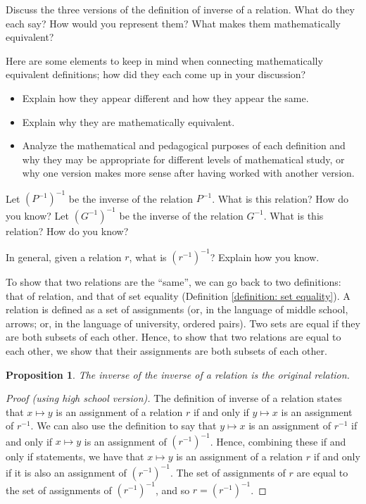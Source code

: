 \documentclass[11pt]{article}
\newenvironment{task}
	{\begin{mdframed}[linecolor=lightgray, linewidth=3pt]\raggedright}
	{\end{mdframed}}
\newtheorem{proposition}[theorem]{Proposition}
\theoremstyle{definition}
\begin{document}
\vspace*{-8pt}
\begin{task}
Discuss the three versions of the definition of inverse of a relation. What do they each say? How would you represent them? What makes them mathematically equivalent?
\end{task}

Here are some elements to keep in mind when connecting mathematically equivalent definitions; how did they each come up in your discussion?

\begin{itemize}
\item Explain how they appear different and how they appear the same.
\item Explain why they are mathematically equivalent. 
\item Analyze the mathematical and pedagogical purposes of each definition and why they may be appropriate for different levels of mathematical study, or why one version makes more sense after having worked with another version.
\end{itemize}


\vspace*{-4pt}
\begin{task}
Let $(P^{-1})^{-1}$ be the inverse of the relation $P^{-1}$. What is this relation? How do you know?
Let $(G^{-1})^{-1}$ be the inverse of the relation $G^{-1}$. What is this relation? How do you know?

In general, given a relation $r$, what is $(r^{-1})^{-1}$?  Explain how you know.
\end{task}

To show that two relations are the ``same'', we can go back to two definitions: that of relation, and that of set equality (Definition \ref{definition: set equality}). A relation is defined as a set of assignments (or, in the language of middle school, arrows; or, in the language of university, ordered pairs). Two sets are equal if they are both subsets of each other.  Hence, to show that two relations are equal to each other, we show that their assignments are both subsets of each other.

\begin{proposition}\label{p: inverse of an inverse}
The inverse of the inverse of a relation is the original relation. 
\end{proposition}

\begin{proof}[Proof (using high school version)]
The definition of inverse of a relation states that $x\mapsto y$ is an assignment of a relation $r$ if and only if $y\mapsto x$ is an assignment of $r^{-1}$.  We can also use the definition to say that $y\mapsto x$ is an assignment of $r^{-1}$ if and only if $x\mapsto y$ is an assignment of $(r^{-1})^{-1}$.  Hence, combining these if and only if statements, we have that  $x\mapsto y$ is an assignment of a relation $r$ if and only if it is also an assignment of $(r^{-1})^{-1}$. The set of assignments of $r$ are equal to the set of assignments of $(r^{-1})^{-1}$, and so $r=(r^{-1})^{-1}$.
\end{proof}
\end{document}
